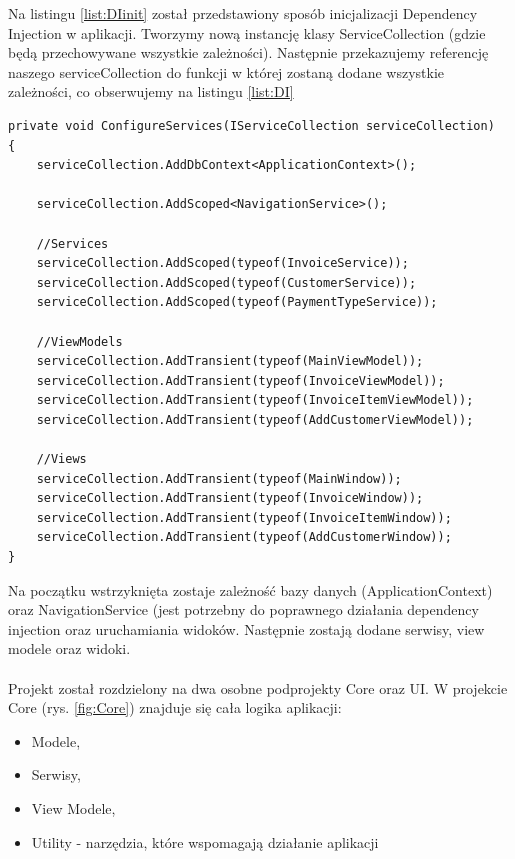 Na listingu \ref{list:DIinit} został przedstawiony sposób inicjalizacji Dependency Injection w aplikacji. Tworzymy nową instancję klasy ServiceCollection (gdzie będą przechowywane wszystkie zależności). Następnie przekazujemy referencję naszego serviceCollection do funkcji w której zostaną dodane wszystkie zależności, co obserwujemy na listingu \ref{list:DI}

\begin{lstlisting}[language={[Sharp]C},label=list:DI,caption=Konfiguracja dependency injection, basicstyle=\footnotesize\ttfamily]
private void ConfigureServices(IServiceCollection serviceCollection)
{
    serviceCollection.AddDbContext<ApplicationContext>();
    
    serviceCollection.AddScoped<NavigationService>();

    //Services
    serviceCollection.AddScoped(typeof(InvoiceService));
    serviceCollection.AddScoped(typeof(CustomerService));
    serviceCollection.AddScoped(typeof(PaymentTypeService));

    //ViewModels
    serviceCollection.AddTransient(typeof(MainViewModel));
    serviceCollection.AddTransient(typeof(InvoiceViewModel));
    serviceCollection.AddTransient(typeof(InvoiceItemViewModel));
    serviceCollection.AddTransient(typeof(AddCustomerViewModel));

    //Views
    serviceCollection.AddTransient(typeof(MainWindow));
    serviceCollection.AddTransient(typeof(InvoiceWindow));
    serviceCollection.AddTransient(typeof(InvoiceItemWindow));
    serviceCollection.AddTransient(typeof(AddCustomerWindow));
}
\end{lstlisting}

Na początku wstrzyknięta zostaje zależność bazy danych (ApplicationContext) oraz NavigationService (jest potrzebny do poprawnego działania dependency injection oraz uruchamiania widoków. Następnie zostają dodane serwisy, view modele oraz widoki. 
\\\\
Projekt został rozdzielony na dwa osobne podprojekty Core oraz UI. W projekcie Core (rys. \ref{fig:Core}) znajduje się cała logika aplikacji:
\begin{itemize}
    \item Modele,
    \item Serwisy,
    \item View Modele,
    \item Utility - narzędzia, które wspomagają działanie aplikacji
\end{itemize}

